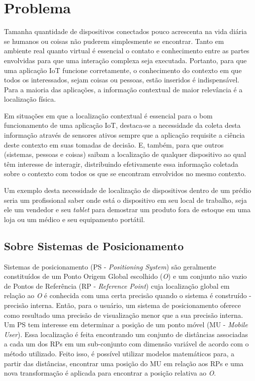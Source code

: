 \section{Problema}
\label{sec:Problema}

Tamanha quantidade de dispositivos conectados pouco acrescenta na vida diária se
humanos ou coisas não puderem simplesmente se encontrar. Tanto em ambiente real
quanto virtual é essencial o contato e conhecimento entre as partes envolvidas
para que uma interação complexa seja executada. Portanto, para que uma aplicação
IoT funcione corretamente, o conhecimento do contexto em que todos os
interessados, sejam coisas ou pessoas, estão inseridos é indispensável. Para a
maioria das aplicações, a informação contextual de maior relevância é a
localização física.

Em situações em que a localização contextual é essencial para o bom funcionamento
de uma aplicação IoT, destaca-se a necessidade da coleta desta informação através
de sensores ativos sempre que a aplicação requisite a ciência deste contexto
em suas tomadas de decisão. E, também, para que outros (sistemas, pessoas e coisas)
saibam a localização de qualquer dispositivo ao qual têm interesse de interagir,
distribuindo efetivamente essa informação coletada sobre o contexto com todos os
que se encontram envolvidos no mesmo contexto.

Um exemplo desta necessidade de localização de dispositivos dentro de um prédio
seria um profissional saber onde está o dispositivo em seu local de trabalho,
seja ele um vendedor e seu \emph{tablet} para demostrar um produto fora de
estoque em uma loja ou um médico e seu equipamento portátil.

\subsection{Sobre Sistemas de Posicionamento}
\label{subsec:Sobre Sistemas de Posicionamento}

Sistemas de posicionamento (PS - \emph{Positioning System}) são geralmente
constituídos de um Ponto Origem Global escolhido (\emph{O}) e um conjunto não
vazio de Pontos de Referência (RP - \emph{Reference Point}) cuja localização
global em relação ao \emph{O} é conhecida com uma certa precisão quando o sistema
é construído - precisão interna. Então, para o usuário, um sistema de posicionamento
oferece como resultado uma precisão de visualização menor que a sua precisão interna.
Um PS tem interesse em determinar a posição de um ponto móvel (MU - \emph{Mobile User}).
Essa localização é feita encontrando um conjunto de distâncias associadas a cada um dos RPs em um
sub-conjunto com dimensão variável de acordo com o método utilizado. Feito isso, é
possível utilizar modelos matemáticos para, a partir das distâncias, encontrar
uma posição do MU em relação aos RPs e uma nova transformação é aplicada para
encontrar a posição relativa ao \emph{O}.

